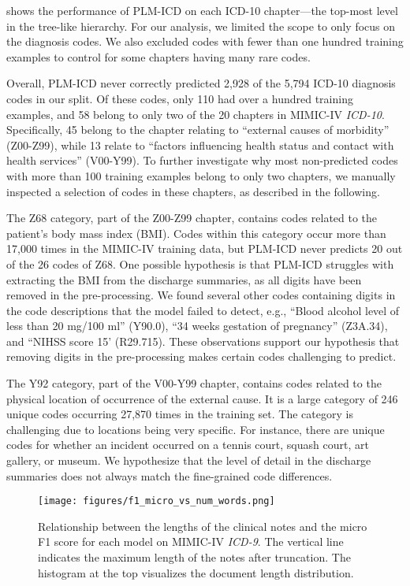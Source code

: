 \documentclass[anonymous=false, sigconf=true, review=false, natbib=true]{acmart}
\begin{document}
 shows the performance of PLM-ICD on each ICD-10 chapter---the top-most level in the tree-like hierarchy. 
For our analysis, we limited the scope to only focus on the diagnosis codes. We also excluded codes with fewer than one hundred training examples to control for some chapters having many rare codes. 

Overall, PLM-ICD never correctly predicted 2,928 of the 5,794 ICD-10 diagnosis codes in our split. Of these codes, only 110 had over a hundred training examples, and 58 belong to only two of the 20 chapters in MIMIC-IV \textit{ICD-10}. Specifically, 45 belong to the chapter relating to ``external causes of morbidity'' (Z00-Z99), while 13 relate to ``factors influencing health status and contact with health services'' (V00-Y99). To further investigate why most non-predicted codes with more than 100 training examples belong to only two chapters, we manually inspected a selection of codes in these chapters, as described in the following.

The Z68 category, part of the Z00-Z99 chapter, contains codes related to the patient's body mass index (BMI). Codes within this category occur more than 17,000 times in the MIMIC-IV training data, but PLM-ICD never predicts 20 out of the 26 codes of Z68. One possible hypothesis is that PLM-ICD struggles with extracting the BMI from the discharge summaries, as all digits have been removed in the pre-processing. We found several other codes containing digits in the code descriptions that the model failed to detect, e.g., ``Blood alcohol level of less than 20 mg/100 ml'' (Y90.0), ``34 weeks gestation of pregnancy'' (Z3A.34), and ``NIHSS score 15' (R29.715). These observations support our hypothesis that removing digits in the pre-processing makes certain codes challenging to predict.

The Y92 category, part of the V00-Y99 chapter, contains codes related to the physical location of occurrence of the external cause. It is a large category of 246 unique codes occurring 27,870 times in the training set. The category is challenging due to locations being very specific. For instance, there are unique codes for whether an incident occurred on a tennis court, squash court, art gallery, or museum. We hypothesize that the level of detail in the discharge summaries does not always match the fine-grained code differences.

\begin{figure}[t]
    \centering
    \texttt{[image: figures/f1\_micro\_vs\_num\_words.png]}
    \caption{Relationship between the lengths of the clinical notes and the micro F1 score for each model on MIMIC-IV \textit{ICD-9}. The vertical line indicates the maximum length of the notes after truncation. The histogram at the top visualizes the document length distribution.}
    \label{fig:text_length}
\end{figure}
\end{document}
